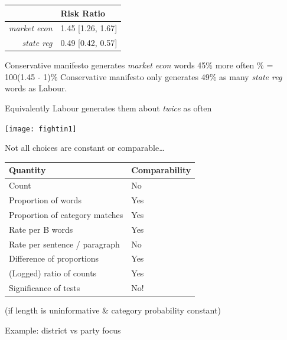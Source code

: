 \documentclass{mediumfoils}
\begin{document}
\begin{center}
\begin{tabular}{rl} \toprule
 & Risk Ratio\\ \midrule
\textsl{market econ} & 1.45 [1.26, 1.67]\\ 
\textsl{state reg} & 0.49 [0.42, 0.57] \\ \bottomrule
\end{tabular} 
\end{center}

 Conservative manifesto generates \textsl{market econ} words 45\% more often 
\ita
{}\% = 100(1.45 - 1)\% 
\itz
Conservative manifesto only generates 49\% as many \textsl{state reg} words as Labour.  

Equivalently Labour generates them about \textsl{twice} as often


\centerline{\texttt{[image: fightin1]}}



Not all choices are constant or comparable\ldots

{\small
\begin{center}
\begin{tabular}{ll} \toprule
Quantity & Comparability\\ \midrule
Count & No \\
Proportion of words & Yes\\
Proportion of category matches & Yes\\
Rate per B words & Yes\\ 
Rate per sentence / paragraph & No\\
Difference of proportions & Yes\\
(Logged) ratio of counts & Yes\\ 
Significance of tests & No!\\
\bottomrule
\end{tabular}
\end{center}
\normalsize}

(if length is uninformative \& category probability constant)




Example: district vs party focus
\end{document}
